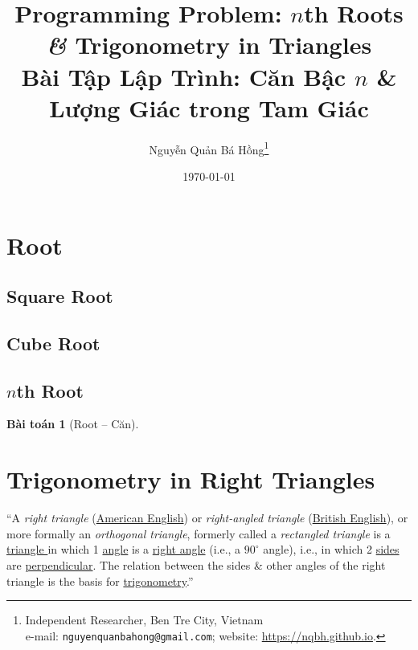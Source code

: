 \documentclass{article}
\title{Programming Problem: $n$th Roots {\it\&} Trigonometry in Triangles\\Bài Tập Lập Trình: Căn Bậc $n$ \& Lượng Giác trong Tam Giác}
\author{Nguyễn Quản Bá Hồng\footnote{Independent Researcher, Ben Tre City, Vietnam\\e-mail: \texttt{nguyenquanbahong@gmail.com}; website: \url{https://nqbh.github.io}.}}
\date{\today}
\newtheorem{baitoan}{Bài toán}
\begin{document}
\maketitle
\tableofcontents


\section{Root}

\subsection{Square Root}

\subsection{Cube Root}

\subsection{$n$th Root}

\begin{baitoan}[Root -- Căn]
	
\end{baitoan}


\section{Trigonometry in Right Triangles}
``A \textit{right triangle} (\href{https://en.wikipedia.org/wiki/American_English}{American English}) or \textit{right-angled triangle} (\href{https://en.wikipedia.org/wiki/British_English}{British English}), or more formally an \textit{orthogonal triangle}, formerly called a \textit{rectangled triangle} is a \href{https://en.wikipedia.org/wiki/Triangle}{triangle } in which 1 \href{https://en.wikipedia.org/wiki/Angle}{angle} is a \href{https://en.wikipedia.org/wiki/Right_angle}{right angle} (i.e., a $90^\circ$ angle), i.e., in which 2 \href{https://en.wikipedia.org/wiki/Polygon_side}{sides} are \href{https://en.wikipedia.org/wiki/Perpendicular}{perpendicular}. The relation between the sides \& other angles of the right triangle is the basis for \href{https://en.wikipedia.org/wiki/Trigonometry}{trigonometry}.''
\end{document}
